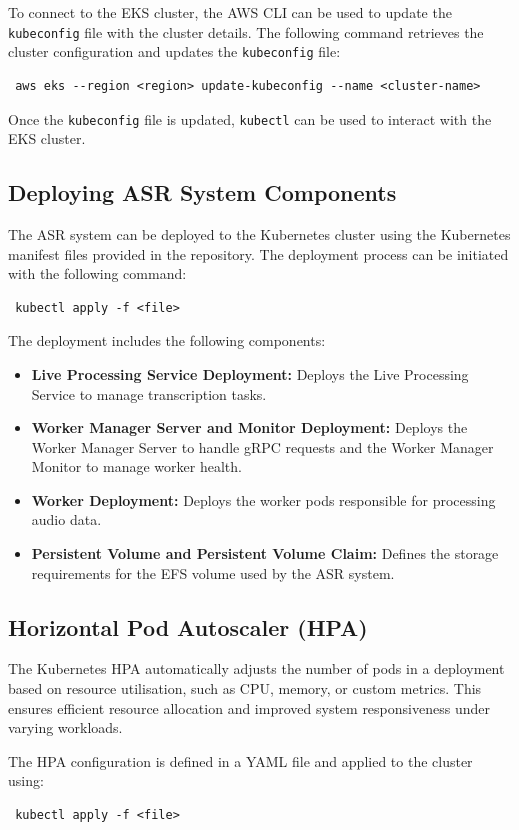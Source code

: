 To connect to the EKS cluster, the AWS CLI can be used to update the \texttt{kubeconfig} file with the cluster details. The following command retrieves the cluster configuration and updates the \texttt{kubeconfig} file:
\begin{verbatim}
 aws eks --region <region> update-kubeconfig --name <cluster-name>
\end{verbatim}

Once the \texttt{kubeconfig} file is updated, \texttt{kubectl} can be used to interact with the EKS cluster.

\subsection{Deploying ASR System Components}
The ASR system can be deployed to the Kubernetes cluster using the Kubernetes manifest files provided in the repository. The deployment process can be initiated with the following command:
\begin{verbatim}
 kubectl apply -f <file>
\end{verbatim}

The deployment includes the following components:
\begin{itemize}
    \item \textbf{Live Processing Service Deployment:} Deploys the Live Processing Service to manage transcription tasks.
    \item \textbf{Worker Manager Server and Monitor Deployment:} Deploys the Worker Manager Server to handle gRPC requests and the Worker Manager Monitor to manage worker health.
    \item \textbf{Worker Deployment:} Deploys the worker pods responsible for processing audio data.
    \item \textbf{Persistent Volume and Persistent Volume Claim:} Defines the storage requirements for the EFS  volume used by the ASR system.
\end{itemize}

\subsection{Horizontal Pod Autoscaler (HPA)}
The Kubernetes HPA automatically adjusts the number of pods in a deployment based on resource utilisation, such as CPU, memory, or custom metrics. This ensures efficient resource allocation and improved system responsiveness under varying workloads.

The HPA configuration is defined in a YAML file and applied to the cluster using:
\begin{verbatim}
 kubectl apply -f <file>
\end{verbatim}

